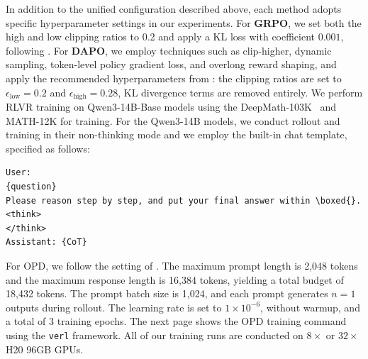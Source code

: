 \documentclass{article}
\begin{document}
In addition to the unified configuration described above, each method adopts specific hyperparameter settings in our experiments. For \textbf{GRPO}, we set both the high and low clipping ratios to 0.2 and apply a KL loss with coefficient $0.001$, following \cite{deepseekai2025deepseekr1incentivizingreasoningcapability}. For \textbf{DAPO}, we employ techniques such as clip-higher, dynamic sampling, token-level policy gradient loss, and overlong reward shaping, and apply the recommended hyperparameters from \cite{yu2025dapoopensourcellmreinforcement}: the clipping ratios are set to $\epsilon_{\text{low}} = 0.2$ and $\epsilon_{\text{high}} = 0.28$, KL divergence terms are removed entirely. We perform RLVR training on Qwen3-14B-Base models using the DeepMath-103K~\citep{he2025deepmath103klargescalechallengingdecontaminated} and MATH-12K \citep{lightman2023lets} for training. For the Qwen3-14B models, we conduct rollout and training in their non-thinking mode and we employ the built-in chat template, specified as follows:

\begin{verbatim}
User: 
{question} 
Please reason step by step, and put your final answer within \boxed{}.
<think>
</think>
Assistant: {CoT}
\end{verbatim}



For OPD, we follow the setting of \citet{Yang2026LearningBT}. The maximum prompt length is 2{,}048 tokens and the maximum response length is 16{,}384 tokens, yielding a total budget of 18{,}432 tokens. The prompt batch size is 1{,}024, and each prompt generates $n = 1$ outputs during rollout. The learning rate is set to $1 \times 10^{-6}$, without warmup, and a total of 3 training epochs. The next page shows the OPD training command using the \texttt{verl} framework. All of our training runs are conducted on $8\times$ or $32\times$ H20 96GB GPUs.
\end{document}
